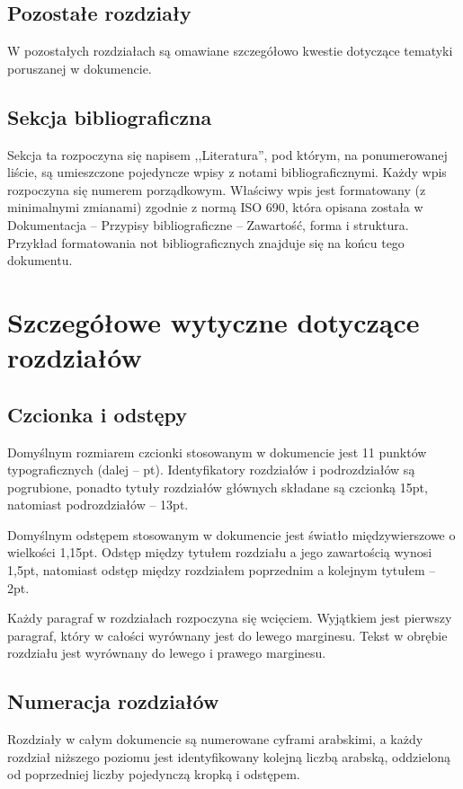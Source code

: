 \documentclass 	[11pt, a4paper, leqno]	{article}					%
\begin{document}
\subsection{Pozostałe rozdziały}
\noindent
W pozostałych rozdziałach są omawiane szczegółowo kwestie dotyczące tematyki poruszanej w dokumencie.

\subsection{Sekcja bibliograficzna}
\noindent
Sekcja ta rozpoczyna się napisem ,,Literatura'', pod którym, na ponumerowanej liście, są umieszczone pojedyncze wpisy z notami bibliograficznymi.
Każdy wpis rozpoczyna się numerem porządkowym. Właściwy wpis jest formatowany (z minimalnymi zmianami) zgodnie z normą ISO 690, która opisana została w Dokumentacja – Przypisy bibliograficzne – Zawartość, forma i struktura.
Przykład formatowania not bibliograficznych znajduje się na końcu tego dokumentu.

\section{Szczegółowe wytyczne dotyczące rozdziałów}

\subsection{Czcionka i odstępy}
\noindent
Domyślnym rozmiarem czcionki stosowanym w dokumencie jest 11 punktów typograficznych (dalej -- pt). Identyfikatory rozdziałów i podrozdziałów są pogrubione, ponadto tytuły rozdziałów głównych składane są czcionką 15pt, natomiast podrozdziałów -- 13pt.

Domyślnym odstępem stosowanym w dokumencie jest światło międzywierszowe o wielkości 1,15pt. Odstęp między tytułem rozdziału a jego zawartością wynosi 1,5pt, natomiast odstęp między rozdziałem poprzednim a kolejnym tytułem -- 2pt.
	
Każdy paragraf w rozdziałach rozpoczyna się wcięciem. Wyjątkiem jest pierwszy paragraf, który w całości wyrównany jest do lewego marginesu.  Tekst w obrębie rozdziału jest wyrównany do lewego i prawego marginesu.

\subsection{Numeracja rozdziałów}
\noindent
Rozdziały w całym dokumencie są numerowane cyframi arabskimi, a każdy rozdział niższego poziomu jest identyfikowany kolejną liczbą arabską, oddzieloną od poprzedniej liczby pojedynczą kropką i odstępem. 
\end{document}
